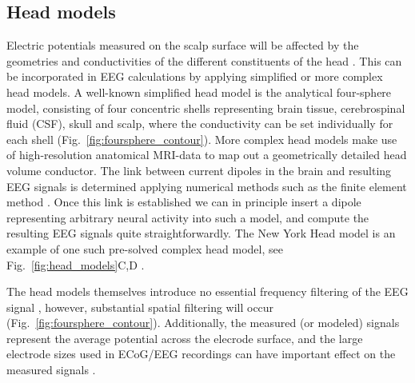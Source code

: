 \documentclass[preprint,11pt,authoryear]{elsarticle}
\newcommand{\hlj}[2][OliveGreen]{ {\sethlcolor{#1} \hl{#2}} }
\newcommand{\hlp}[2][Purple]{ {\sethlcolor{#1} \hl{#2}} }
\newcommand{\tvnnote}[1]{\color{white}{\hlj{TVN: #1 }}\color{black}}
\newcommand{\snnote}[1]{\color{white}{\hlp{SN: #1 }}\color{black}}
\begin{document}
\subsection{Head models}
Electric potentials measured on the scalp surface will be affected by the geometries and conductivities of the different constituents of the head \citep{Nunez2006}. This can be incorporated in EEG calculations by applying simplified or more complex head models.
A well-known simplified head model is the analytical four-sphere model, consisting of four concentric shells representing brain tissue, cerebrospinal fluid (CSF), skull and scalp, where the conductivity can be set individually for each shell \citep{Naess2017, Srinivasan1998, Nunez2006} (Fig.~\ref{fig:foursphere_contour}).
More complex head models make use of high-resolution anatomical MRI-data to map out a geometrically detailed head volume conductor. The link between current dipoles in the brain and resulting EEG signals is determined applying numerical methods such as the finite element method \citep{Larson2013, Logg2012}. Once this link is established we can in principle insert a dipole representing arbitrary neural activity into such a model, and compute the resulting EEG signals quite straightforwardly. The New York Head model is an example of one such pre-solved complex head model, see Fig.~\ref{fig:head_models}C,D \citep{Huang2016}.

The head models themselves introduce no essential frequency filtering of the EEG signal \citep{Pfurtscheller1975, Nunez2006, Ranta2017}, however, substantial spatial filtering will occur (Fig.~\ref{fig:foursphere_contour}). Additionally, the measured (or modeled) signals represent the average potential across the elecrode surface, and the large electrode sizes used in ECoG/EEG recordings can have important effect on the measured signals \citep{Nunez2006, Hagen2018, Dubey2019}.
%
%
\end{document}
